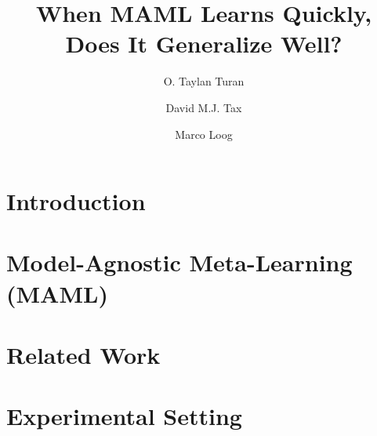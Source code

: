 \documentclass[runningheads]{llncs}
\newcommand{\version}{v3/}
\begin{document}
%
\title{When MAML Learns Quickly, Does It Generalize Well?}
%
%

\author{O. Taylan Turan\and
David M.J. Tax\and
Marco Loog}
%
%

%
\maketitle              %


\begin{abstract}
  
\end{abstract}



\section{Introduction}\label{sec:intro}
  
\section{Model-Agnostic Meta-Learning (MAML)}\label{sec:maml}
  
\section{Related Work}\label{sec:rw}
  
\section{Experimental Setting}\label{sec:methods}
  
\end{document}
